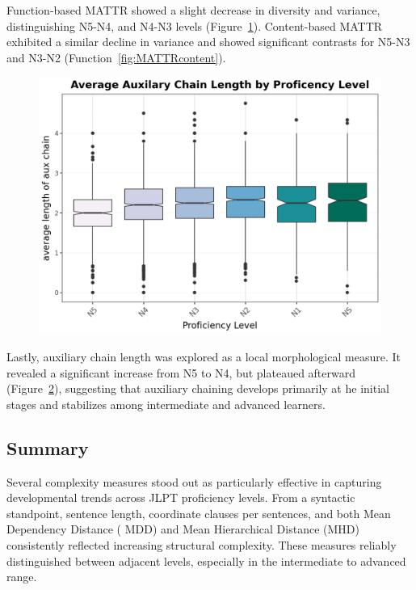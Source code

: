 \begin{figure}[htbp]
\begin{minipage}{.48\textwidth}
        \caption[MATTR function]{}
\label{fig:MATTRfunction}
\end{minipage}
    \end{figure}

Function-based MATTR showed a slight decrease in diversity and
variance, distinguishing N5-N4, and N4-N3 levels (Figure~\ref{fig:MATTRfunction}). Content-based MATTR exhibited a
similar decline in variance and showed significant contrasts for N5-N3 and N3-N2 (Function~\ref{fig:MATTRcontent}).

\begin{figure}[htpb]
\centering
\includegraphics[scale=.5]{img/auxchains}
\caption[Average Length of auxilary verb chains]{}
\label{fig:auxchain}
\end{figure}
Lastly, auxiliary chain length was explored as a local morphological measure. It revealed a significant increase
from N5 to N4, but plateaued afterward (Figure~\ref{fig:auxchain}), suggesting that auxiliary chaining develops
primarily
at he
initial stages
and stabilizes among intermediate and advanced learners.


\subsection{Summary}
Several complexity measures stood out as particularly effective in capturing developmental trends across JLPT
proficiency levels.
From a syntactic standpoint, sentence length, coordinate clauses per sentences, and both Mean Dependency Distance (
MDD) and Mean Hierarchical Distance (MHD) consistently reflected increasing structural complexity. These measures
reliably distinguished between adjacent levels, especially in the intermediate to advanced range.

